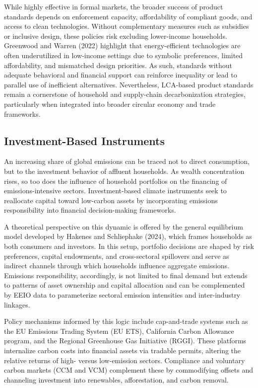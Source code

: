 \documentclass[12pt,a4paper]{article}%
\begin{document}
While highly effective in formal markets, the broader success of product standards depends on enforcement capacity, affordability of compliant goods, and access to clean technologies. Without complementary measures such as subsidies or inclusive design, these policies risk excluding lower-income households. Greenwood and Warren (2022) highlight that energy-efficient technologies are often underutilized in low-income settings due to symbolic preferences, limited affordability, and mismatched design priorities. As such, standards without adequate behavioral and financial support can reinforce inequality or lead to parallel use of inefficient alternatives. Nevertheless, LCA-based product standards remain a cornerstone of household and supply-chain decarbonization strategies, particularly when integrated into broader circular economy and trade frameworks.

\subsection{Investment-Based Instruments}
An increasing share of global emissions can be traced not to direct consumption, but to the investment behavior of affluent households. As wealth concentration rises, so too does the influence of household portfolios on the financing of emissions-intensive sectors. Investment-based climate instruments seek to reallocate capital toward low-carbon assets by incorporating emissions responsibility into financial decision-making frameworks.

A theoretical perspective on this dynamic is offered by the general equilibrium model developed by Hakenes and Schliephake (2024), which frames households as both consumers and investors. In this setup, portfolio decisions are shaped by risk preferences, capital endowments, and cross-sectoral spillovers and serve as indirect channels through which households influence aggregate emissions. Emissions responsibility, accordingly, is not limited to final demand but extends to patterns of asset ownership and capital allocation and can be complemented by EEIO data to parameterize sectoral emission intensities and inter-industry linkages.

Policy mechanisms informed by this logic include cap-and-trade systems such as the EU Emissions Trading System (EU ETS), California Carbon Allowance program, and the Regional Greenhouse Gas Initiative (RGGI). These platforms internalize carbon costs into financial assets via tradable permits, altering the relative returns of high- versus low-emission sectors. Compliance and voluntary carbon markets (CCM and VCM) complement these by commodifying offsets and channeling investment into renewables, afforestation, and carbon removal.
\end{document}
